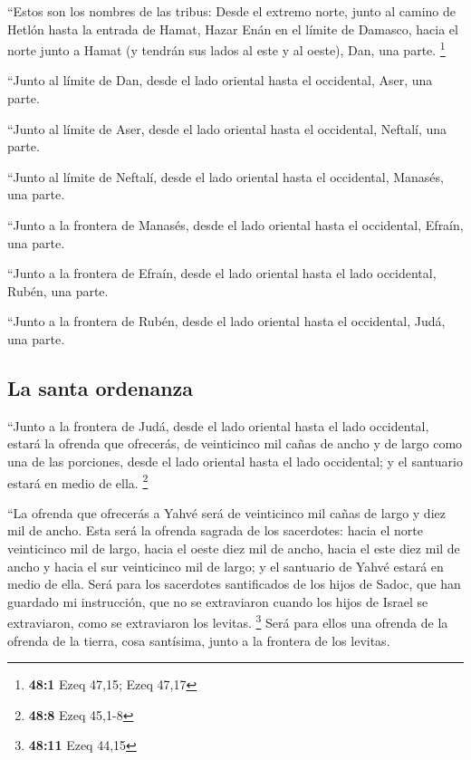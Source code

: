  ``Estos son los nombres de las tribus: Desde el extremo
norte, junto al camino de Hetlón hasta la entrada de Hamat, Hazar Enán
en el límite de Damasco, hacia el norte junto a Hamat (y tendrán sus
lados al este y al oeste), Dan, una parte. \footnote{\textbf{48:1} Ezeq
  47,15; Ezeq 47,17}

 ``Junto al límite de Dan, desde el lado oriental hasta el
occidental, Aser, una parte.

 ``Junto al límite de Aser, desde el lado oriental hasta
el occidental, Neftalí, una parte.

 ``Junto al límite de Neftalí, desde el lado oriental
hasta el occidental, Manasés, una parte.

 ``Junto a la frontera de Manasés, desde el lado oriental
hasta el occidental, Efraín, una parte.

 ``Junto a la frontera de Efraín, desde el lado oriental
hasta el lado occidental, Rubén, una parte.

 ``Junto a la frontera de Rubén, desde el lado oriental
hasta el occidental, Judá, una parte.

\hypertarget{la-santa-ordenanza}{%
\subsection{La santa ordenanza}\label{la-santa-ordenanza}}

 ``Junto a la frontera de Judá, desde el lado oriental
hasta el lado occidental, estará la ofrenda que ofrecerás, de
veinticinco mil cañas de ancho y de largo como una de las porciones,
desde el lado oriental hasta el lado occidental; y el santuario estará
en medio de ella. \footnote{\textbf{48:8} Ezeq 45,1-8}

 ``La ofrenda que ofrecerás a Yahvé será de veinticinco
mil cañas de largo y diez mil de ancho.  Esta será la
ofrenda sagrada de los sacerdotes: hacia el norte veinticinco mil de
largo, hacia el oeste diez mil de ancho, hacia el este diez mil de ancho
y hacia el sur veinticinco mil de largo; y el santuario de Yahvé estará
en medio de ella.  Será para los sacerdotes santificados
de los hijos de Sadoc, que han guardado mi instrucción, que no se
extraviaron cuando los hijos de Israel se extraviaron, como se
extraviaron los levitas. \footnote{\textbf{48:11} Ezeq 44,15}
 Será para ellos una ofrenda de la ofrenda de la tierra,
cosa santísima, junto a la frontera de los levitas.

